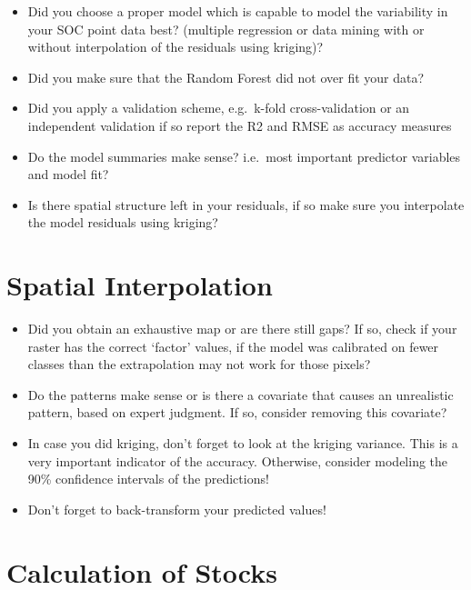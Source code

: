 \documentclass[10pt,b5paper,]{book}
\providecommand{\tightlist}{%
  \setlength{\itemsep}{0pt}\setlength{\parskip}{0pt}}
\theoremstyle{definition}
\theoremstyle{definition}
\theoremstyle{definition}
\theoremstyle{remark}
\begin{document}
\begin{itemize}
\tightlist
\item
  Did you choose a proper model which is capable to model the
  variability in your SOC point data best? (multiple regression or data
  mining with or without interpolation of the residuals using kriging)?
\item
  Did you make sure that the Random Forest did not over fit your data?
\item
  Did you apply a validation scheme, e.g.~k-fold cross-validation or an
  independent validation if so report the R2 and RMSE as accuracy
  measures
\item
  Do the model summaries make sense? i.e.~most important predictor
  variables and model fit?
\item
  Is there spatial structure left in your residuals, if so make sure you
  interpolate the model residuals using kriging?
\end{itemize}

\hypertarget{spatial-interpolation}{%
\section{Spatial Interpolation}\label{spatial-interpolation}}

\begin{itemize}
\tightlist
\item
  Did you obtain an exhaustive map or are there still gaps? If so, check
  if your raster has the correct `factor' values, if the model was
  calibrated on fewer classes than the extrapolation may not work for
  those pixels?
\item
  Do the patterns make sense or is there a covariate that causes an
  unrealistic pattern, based on expert judgment. If so, consider
  removing this covariate?
\item
  In case you did kriging, don't forget to look at the kriging variance.
  This is a very important indicator of the accuracy. Otherwise,
  consider modeling the 90\% confidence intervals of the predictions!
\item
  Don't forget to back-transform your predicted values!
\end{itemize}

\hypertarget{calculation-of-stocks}{%
\section{Calculation of Stocks}\label{calculation-of-stocks}}
\end{document}
